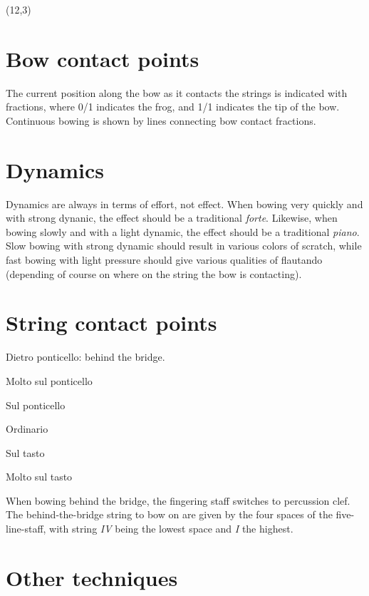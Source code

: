 \documentclass[10pt]{article}
\begin{document}
\begin{textblock}{11}(12,3)

\scriptsize

\section{Bow contact points}

The current position along the bow as it contacts the strings is indicated
with fractions, where 0/1 indicates the frog, and 1/1 indicates the tip of
the bow. Continuous bowing is shown by lines connecting bow contact
fractions.

\section{Dynamics}

Dynamics are always in terms of effort, not effect. When bowing very
quickly and with strong dynanic, the effect should be a traditional
\emph{forte}. Likewise, when bowing slowly and with a light dynamic, the
effect should be a traditional \emph{piano}. Slow bowing with strong
dynamic should result in various colors of scratch, while fast bowing with
light pressure should give various qualities of flautando (depending of
course on where on the string the bow is contacting).

\section{String contact points}

\begin{description}[style=nextline]
    \item[D.P.]
        Dietro ponticello: behind the bridge.
    \item[M.S.P.]
        Molto sul ponticello
    \item[S.P.]
        Sul ponticello
    \item[Ord.]
        Ordinario
    \item[S.T.]
        Sul tasto
    \item[M.S.T.]
        Molto sul tasto
\end{description}

When bowing behind the bridge, the fingering staff switches to percussion
clef. The behind-the-bridge string to bow on are given by the four spaces
of the five-line-staff, with string \emph{IV} being the lowest space and
\emph{I} the highest.

\section{Other techniques}


\end{textblock}
\end{document}
